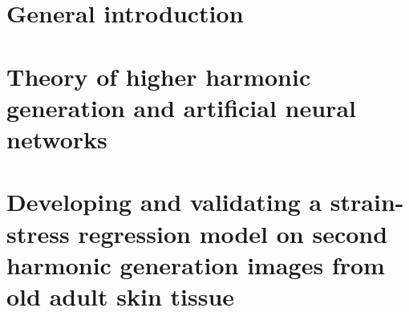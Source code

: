 \documentclass[
	fontsize=10pt, %
	twoside=false, %
	secnumdepth=2, %
	numbers=noenddot,
]{kaobook}
\begin{document}
\listoffigures %

\let\cleardoublepage\bigskip
\let\clearpage\bigskip

\listoftables %

\endgroup


\mainmatter %

\chapter{General introduction}\label{ch:general_introduction}




\chapter{Theory of higher harmonic generation and artificial neural networks}\label{ch:theory}





\chapter[Skinstression]{Developing and validating a strain-stress regression model on second harmonic generation images from old adult skin tissue}\label{ch:skinstression}
\end{document}
